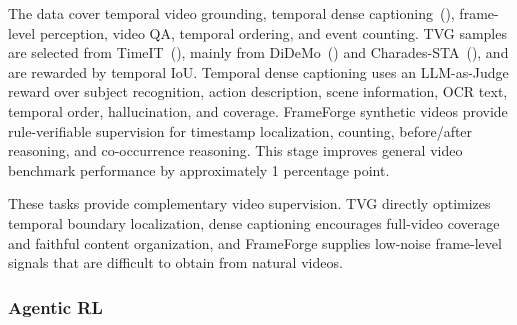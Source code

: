 \documentclass{llmxive}
\begin{document}
The data cover temporal video grounding, temporal dense captioning~(\cite{vcap}), frame-level perception, video QA, temporal ordering, and event counting. TVG samples are selected from TimeIT~(\cite{timeit}), mainly from DiDeMo~(\cite{didemo}) and Charades-STA~(\cite{charades_sta}), and are rewarded by temporal IoU. Temporal dense captioning uses an LLM-as-Judge reward over subject recognition, action description, scene information, OCR text, temporal order, hallucination, and coverage. FrameForge synthetic videos provide rule-verifiable supervision for timestamp localization, counting, before/after reasoning, and co-occurrence reasoning. This stage improves general video benchmark performance by approximately 1 percentage point.

These tasks provide complementary video supervision. TVG directly optimizes temporal boundary localization, dense captioning encourages full-video coverage and faithful content organization, and FrameForge supplies low-noise frame-level signals that are difficult to obtain from natural videos.

\subsubsection{Agentic RL}


\end{document}
